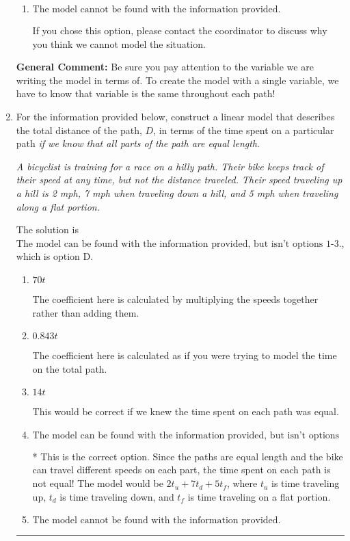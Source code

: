 \documentclass{extbook}[14pt]
\newcommand{\litem}[1]{\item #1

\rule{\textwidth}{0.4pt}}
\begin{document}
\begin{enumerate}
{\begin{enumerate}[label=\Alph*.]
Since we know all parts of the path are equal length, we can treat all distance variables as the same variable, $D$.
\item \( \text{The model cannot be found with the information provided.} \)

If you chose this option, please contact the coordinator to discuss why you think we cannot model the situation.
\end{enumerate}

\textbf{General Comment:} Be sure you pay attention to the variable we are writing the model in terms of. To create the model with a single variable, we have to know that variable is the same throughout each path!
}
\litem{
For the information provided below, construct a linear model that describes the total distance of the path, $D$, in terms of the time spent on a particular path \textit{if we know that all parts of the path are equal length}.

\begin{center}
    \textit{ A bicyclist is training for a race on a hilly path. Their bike keeps track of their speed at any time, but not the distance traveled. Their speed traveling up a hill is 2 mph, 7 mph when traveling down a hill, and 5 mph when traveling along a flat portion. }
\end{center}
The solution is \( \text{The model can be found with the information provided, but isn't options 1-3.} \), which is option D.\begin{enumerate}[label=\Alph*.]
\item \( 70 t \)

The coefficient here is calculated by multiplying the speeds together rather than adding them.
\item \( 0.843 t \)

The coefficient here is calculated as if you were trying to model the time on the total path.
\item \( 14 t \)

This would be correct if we knew the time spent on each path was equal.
\item \( \text{The model can be found with the information provided, but isn't options 1-3.} \)

* This is the correct option. Since the paths are equal length and the bike can travel different speeds on each part, the time spent on each path is not equal! The model would be $2t_u + 7t_d +5t_f$, where $t_u$ is time traveling up, $t_d$ is time traveling down, and $t_f$ is time traveling on a flat portion.
\item \( \text{The model cannot be found with the information provided.} \)


\end{enumerate}}
\end{enumerate}
\end{document}
